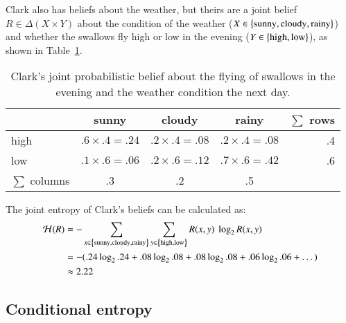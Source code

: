 \documentclass[nobib,nofonts]{tufte-handout}
\begin{document}
\begin{example}

Clark also has beliefs about the weather, but theirs are a joint belief $R \in \Delta(X \times Y)$ about the condition of the weather ($X \in \left\{\text{sunny}, \text{cloudy}, \text{rainy}\right\} $) and whether the swallows fly high or low in the evening ($Y \in \left\{\text{high}, \text{low}\right\}$), as shown in Table~\ref{tab:joint-prob-Clark}.

  \begin{table}

    \begin{tabular}{lcccr}
           & sunny                 & cloudy                & rainy                 & $\sum$ rows \\ \midrule
      high & $.6 \times .4 = .24$ & $.2 \times .4 = .08$ & $.2 \times .4 = .08$ & .4 \\
      low  & $.1 \times .6 = .06$ & $.2 \times .6 = .12$ & $.7 \times .6 = .42$ & .6 \\ \midrule
      $\sum$ columns & .3 & .2 & .5
    \end{tabular}

  \caption{Clark's joint probabilistic belief about the flying of swallows in the evening and the weather condition the next day.}
  \label{tab:joint-prob-Clark}

\end{table}

\medskip

  The joint entropy of Clark's beliefs can be calculated as:
  \begin{align*}
    \mathcal{H}(R) & = - \sum_{x \in \left\{\text{sunny}, \text{cloudy}, \text{rainy}\right\}} \sum_{y \in \left\{\text{high}, \text{low}\right\}} R(x,y) \ \log_{2} R(x,y) \\
                   & = - (.24 \log_{2} .24  +
                     .08 \log_{2} .08  +
                     .08 \log_{2} .08  +
                     .06 \log_{2} .06  +
                     \dots
                     ) \\
    & \approx 2.22
  \end{align*}


\end{example}

\subsection{Conditional entropy}
\end{document}
